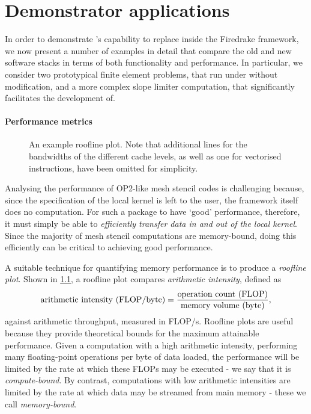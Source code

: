 \documentclass[thesis]{subfiles}
\begin{document}
\chapter{Demonstrator applications}
\label{chapter:demonstrator_applications}

In order to demonstrate 's capability to replace  inside the Firedrake framework, we now present a number of examples in detail that compare the old and new software stacks in terms of both functionality and performance.
In particular, we consider two prototypical finite element problems, that run under  without modification, and a more complex slope limiter computation, that  significantly facilitates the development of.

\subsubsection{Performance metrics}

\begin{figure}
  \centering
  
  \caption{
    An example roofline plot.
    Note that additional lines for the bandwidths of the different cache levels, as well as one for vectorised instructions, have been omitted for simplicity.
  }
  \label{fig:roofline}
\end{figure}

Analysing the performance of OP2-like mesh stencil codes is challenging because, since the specification of the local kernel is left to the user, the framework itself does no computation.
For such a package to have `good' performance, therefore, it must simply be able to \emph{efficiently transfer data in and out of the local kernel}.
Since the majority of mesh stencil computations are memory-bound, doing this efficiently can be critical to achieving good performance.

A suitable technique for quantifying memory performance is to produce a \emph{roofline plot}.
Shown in \cref{fig:roofline}, a roofline plot compares \emph{arithmetic intensity}, defined as
\begin{equation}
  \textnormal{arithmetic intensity (FLOP/byte)} = \frac{\textnormal{operation count (FLOP)}}{\textnormal{memory volume (byte)}},
\end{equation}
against arithmetic throughput, measured in FLOP/s.
Roofline plots are useful because they provide theoretical bounds for the maximum attainable performance.
Given a computation with a high arithmetic intensity, performing many floating-point operations per byte of data loaded, the performance will be limited by the rate at which these FLOPs may be executed - we say that it is \emph{compute-bound}.
By contrast, computations with low arithmetic intensities are limited by the rate at which data may be streamed from main memory - these we call \emph{memory-bound}.
\end{document}
